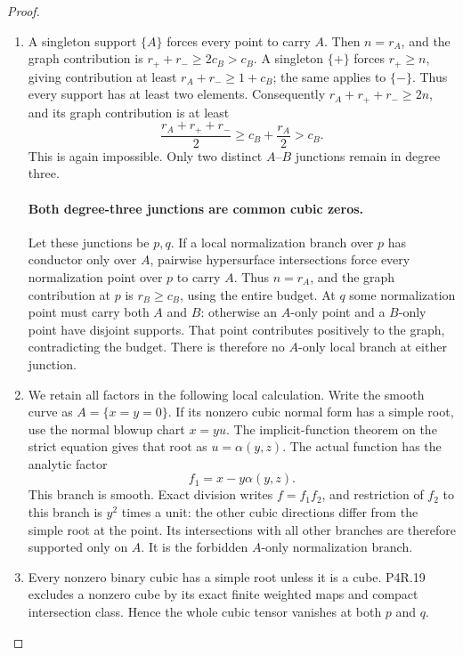 \begin{proof}
\begin{enumerate}[label={$\langle1\rangle$\arabic*.},leftmargin=*]
\item A singleton support $\{A\}$ forces every point to carry
$A$. Then $n=r_A$, and the graph contribution is
$r_++r_-\ge2c_B>c_B$. A singleton $\{+\}$ forces
$r_+\ge n$, giving contribution at least
$r_A+r_-\ge1+c_B$; the same applies to $\{-\}$.
Thus every support has at least two elements. Consequently
$r_A+r_++r_-\ge2n$, and its graph contribution is at least
\[
       \frac{r_A+r_++r_-}{2}
                         \ge c_B+\frac{r_A}{2}>c_B.
\]
This is again impossible. Only two distinct $A$--$B$
junctions remain in degree three.

\paragraph{Both degree-three junctions are common cubic zeros.}
Let these junctions be $p,q$. If a local normalization
branch over $p$ has conductor only over $A$, pairwise
hypersurface intersections force every normalization point
over $p$ to carry $A$. Thus $n=r_A$, and the graph
contribution at $p$ is $r_B\ge c_B$, using the entire
budget. At $q$ some normalization point must carry both
$A$ and $B$: otherwise an $A$-only point and a $B$-only
point have disjoint supports. That point contributes
positively to the graph, contradicting the budget. There
is therefore no $A$-only local branch at either junction.

\item We retain all factors in the following local calculation.
Write the smooth curve as $A=\{x=y=0\}$. If its nonzero
cubic normal form has a simple root, use the normal blowup
chart $x=yu$. The implicit-function theorem on the strict
equation gives that root as $u=\alpha(y,z)$. The actual
function has the analytic factor
\[
                         f_1=x-y\alpha(y,z).
\]
This branch is smooth. Exact division writes $f=f_1f_2$,
and restriction of $f_2$ to this branch is $y^2$ times a
unit: the other cubic directions differ from the simple
root at the point. Its intersections with all other
branches are therefore supported only on $A$. It is the
forbidden $A$-only normalization branch.

\item Every nonzero binary cubic has a simple root unless it is
a cube. P4R.19 excludes a nonzero cube by its exact finite
weighted maps and compact intersection class. Hence the
whole cubic tensor vanishes at both $p$ and $q$.


\end{enumerate}
\end{proof}
